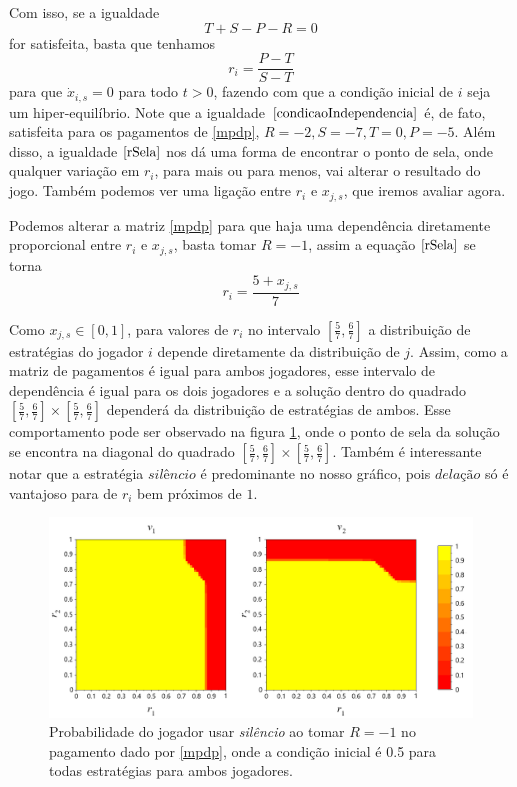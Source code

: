 Com isso, se a igualdade 
\begin{equation}
    \label{condicaoIndependencia}
    T+S-P-R = 0
\end{equation}
for satisfeita, basta que tenhamos
\begin{equation}
    r_i=\frac{P-T}{S-T}
\end{equation}
para que $\dot{x}_{i,s}=0$ para todo $t>0$, fazendo com que a condição inicial de $i$ seja um hiper-equilíbrio. Note que a igualdade $\eqref{condicaoIndependencia}$ é, de fato, satisfeita para os pagamentos de \ref{mpdp}, $R=-2,S=-7,T=0,P=-5$. Além disso, a igualdade $\eqref{rSela}$ nos dá uma forma de encontrar o ponto de sela, onde qualquer variação em $r_i$, para mais ou para menos, vai alterar o resultado do jogo. Também podemos ver uma ligação entre $r_i$ e $x_{j,s}$, que iremos avaliar agora.

Podemos alterar a matriz \ref{mpdp} para que haja uma dependência diretamente proporcional entre $r_i$ e $x_{j,s}$, basta tomar $R=-1$, assim a equação $\eqref{rSela}$ se torna
\begin{equation}
    r_i=\frac{5+x_{j,s}}{7}
\end{equation}

Como $x_{j,s}\in[0,1]$, para valores de $r_i$ no intervalo $[\frac{5}{7},\frac{6}{7}]$ a distribuição de estratégias do jogador $i$ depende diretamente da distribuição de $j$. Assim, como a matriz de pagamentos é igual para ambos jogadores, esse intervalo de dependência é igual para os dois jogadores e a solução dentro do quadrado $[\frac{5}{7},\frac{6}{7}]\times[\frac{5}{7},\frac{6}{7}]$ dependerá da distribuição de estratégias de ambos. Esse comportamento pode ser observado na figura \ref{fig:pd-neg-payoff-dependant}, onde o ponto de sela da solução se encontra na diagonal do quadrado $[\frac{5}{7},\frac{6}{7}]\times[\frac{5}{7},\frac{6}{7}]$. Também é interessante notar que a estratégia $\textit{silêncio}$ é predominante no nosso gráfico, pois $\textit{delação}$ só é vantajoso para de $r_i$ bem próximos de $1$.

\begin{figure}[h]
    \caption{Probabilidade do jogador usar \textit{silêncio} ao tomar $R=-1$ no pagamento dado por \ref{mpdp}, onde a condição inicial é 0.5 para todas estratégias para ambos jogadores.}
    \centerline{\includegraphics[scale=0.43]{./img/PD-neg-payoff-dependant.png}}
    \label{fig:pd-neg-payoff-dependant}
\end{figure}

